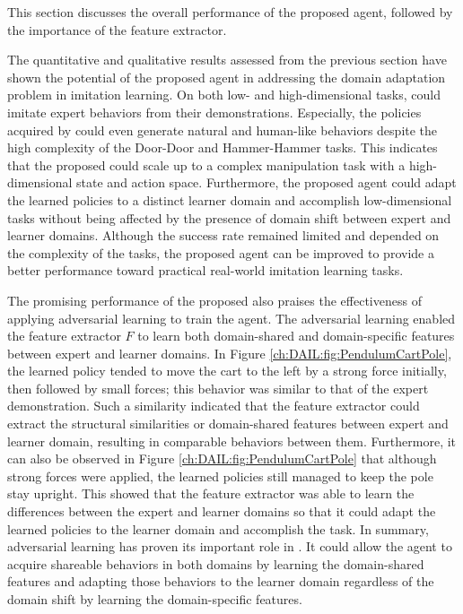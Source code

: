 This section discusses the overall performance of the proposed \DAIL{} agent, followed by the importance of the feature extractor.

The quantitative and qualitative results assessed from the previous section have shown the potential of the proposed \DAIL{} agent in addressing the domain adaptation problem in imitation learning.
On both low- and high-dimensional tasks, \DAIL{} could imitate expert behaviors from their demonstrations.
Especially, the policies acquired by \DAIL{} could even generate natural and human-like behaviors despite the high complexity of the Door-Door and Hammer-Hammer tasks.
This indicates that the proposed \DAIL{} could scale up to a complex manipulation task with a high-dimensional state and action space.
Furthermore, the proposed agent could adapt the learned policies to a distinct learner domain and accomplish low-dimensional tasks without being affected by the presence of domain shift between expert and learner domains.
Although the success rate remained limited and depended on the complexity of the tasks, the proposed agent can be improved to provide a better performance toward practical real-world imitation learning tasks.

The promising performance of the proposed \DAIL{} also praises the effectiveness of applying adversarial learning to train the agent.
The adversarial learning enabled the feature extractor $F$ to learn both domain-shared and domain-specific features between expert and learner domains.
In Figure \ref{ch:DAIL:fig:PendulumCartPole}, the learned policy tended to move the cart to the left by a strong force initially,
then followed by small forces;
this behavior was similar to that of the expert demonstration.
Such a similarity indicated that the feature extractor could extract the structural similarities or domain-shared features between expert and learner domain,
resulting in comparable behaviors between them.
Furthermore,
it can also be observed in Figure \ref{ch:DAIL:fig:PendulumCartPole} that although strong forces were applied,
the learned policies still managed to keep the pole stay upright.
This showed that the feature extractor was able to learn the differences between the expert and learner domains so that it could adapt the learned policies to the learner domain and accomplish the task.
In summary,
adversarial learning has proven its important role in \DAIL{}.
It could allow the agent to acquire shareable behaviors in both domains by learning the domain-shared features and adapting those behaviors to the learner domain regardless of the domain shift by learning the domain-specific features.

